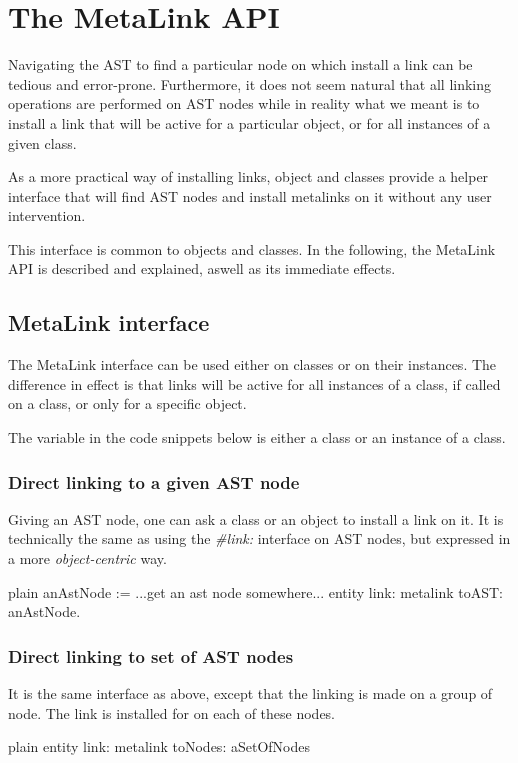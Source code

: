 \documentclass[10pt,twoside,english]{_support/latex/sbabook/sbabook}
\begin{document}
\section{The MetaLink API}
Navigating the AST to find a particular node on which install a link can be tedious and error-prone. Furthermore, it does not seem natural that all linking operations are performed on AST nodes while in reality what we meant is to install a link that will be active for a particular object, or for all instances of a given class.

As a more practical way of installing links, object and classes provide a helper interface that will find AST nodes and install metalinks on it without any user intervention.

This interface is common to objects and classes. In the following, the MetaLink API is described and explained, aswell as its immediate effects.
\subsection{MetaLink interface}
The MetaLink interface can be used either on classes or on their instances. The difference in effect is that links will be active for all instances of a class, if called on a class, or only for a specific object.

The  variable in the code snippets below is either a class or an instance of a class.
\subsubsection{Direct linking to a given AST node}
Giving an AST node, one can ask a class or an object to install a link on it. It is technically the same as using the \textit{\#link:} interface on AST nodes, but expressed in a more \textit{object-centric} way.

\begin{displaycode}{plain}
anAstNode := ...get an ast node somewhere...
entity link: metalink toAST: anAstNode.
\end{displaycode}
\subsubsection{Direct linking to set of AST nodes}
It is the same interface as above, except that the linking is made on a group of node. The link is installed for  on each of these nodes.

\begin{displaycode}{plain}
entity link: metalink toNodes: aSetOfNodes
\end{displaycode}
\end{document}

